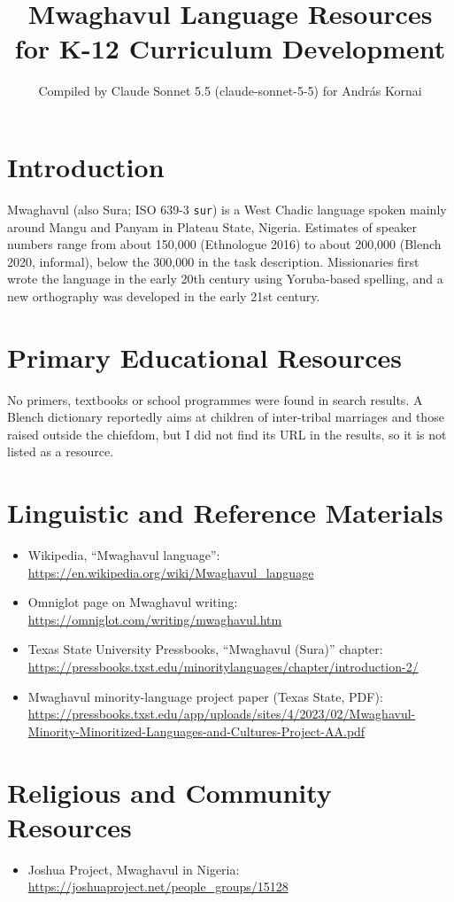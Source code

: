 \documentclass[12pt]{article}
\title{Mwaghavul Language Resources for K-12 Curriculum Development}
\author{Compiled by Claude Sonnet 5.5 (claude-sonnet-5-5) for Andr\'as Kornai}
\date{}
\begin{document}
\maketitle

\section{Introduction}
Mwaghavul (also Sura; ISO 639-3 \texttt{sur}) is a West Chadic language spoken mainly around Mangu and Panyam in Plateau State, Nigeria. Estimates of speaker numbers range from about 150,000 (Ethnologue 2016) to about 200,000 (Blench 2020, informal), below the 300,000 in the task description. Missionaries first wrote the language in the early 20th century using Yoruba-based spelling, and a new orthography was developed in the early 21st century.

\section{Primary Educational Resources}
No primers, textbooks or school programmes were found in search results. A Blench dictionary reportedly aims at children of inter-tribal marriages and those raised outside the chiefdom, but I did not find its URL in the results, so it is not listed as a resource.

\section{Linguistic and Reference Materials}
\begin{itemize}
\item Wikipedia, ``Mwaghavul language'': \url{https://en.wikipedia.org/wiki/Mwaghavul_language}
\item Omniglot page on Mwaghavul writing: \url{https://omniglot.com/writing/mwaghavul.htm}
\item Texas State University Pressbooks, ``Mwaghavul (Sura)'' chapter: \url{https://pressbooks.txst.edu/minoritylanguages/chapter/introduction-2/}
\item Mwaghavul minority-language project paper (Texas State, PDF): \url{https://pressbooks.txst.edu/app/uploads/sites/4/2023/02/Mwaghavul-Minority-Minoritized-Languages-and-Cultures-Project-AA.pdf}
\end{itemize}

\section{Religious and Community Resources}
\begin{itemize}
\item Joshua Project, Mwaghavul in Nigeria: \url{https://joshuaproject.net/people_groups/15128}
\end{itemize}
\end{document}
